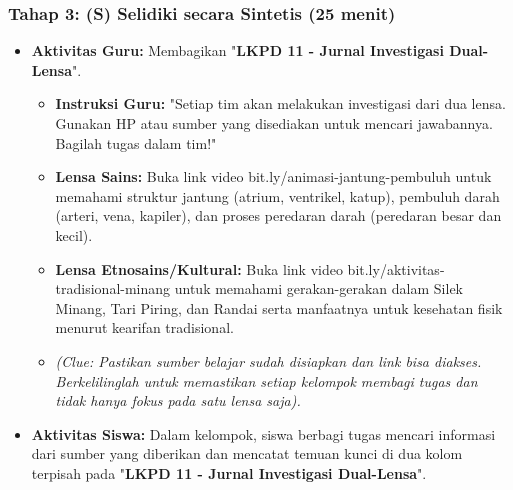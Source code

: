 \documentclass[a4paper,12pt]{article}
\begin{document}
\subsubsection{Tahap 3: (S) Selidiki secara Sintetis (25 menit)}
\begin{itemize}
\item \textbf{Aktivitas Guru:} Membagikan "\textbf{LKPD 11 - Jurnal Investigasi Dual-Lensa}".
    \begin{itemize}
    \item \textbf{Instruksi Guru:} "Setiap tim akan melakukan investigasi dari dua lensa. Gunakan HP atau sumber yang disediakan untuk mencari jawabannya. Bagilah tugas dalam tim!"
    \item \textbf{Lensa Sains:} Buka link video bit.ly/animasi-jantung-pembuluh untuk memahami struktur jantung (atrium, ventrikel, katup), pembuluh darah (arteri, vena, kapiler), dan proses peredaran darah (peredaran besar dan kecil).
    \item \textbf{Lensa Etnosains/Kultural:} Buka link video bit.ly/aktivitas-tradisional-minang untuk memahami gerakan-gerakan dalam Silek Minang, Tari Piring, dan Randai serta manfaatnya untuk kesehatan fisik menurut kearifan tradisional.
    \item \textit{(Clue: Pastikan sumber belajar sudah disiapkan dan link bisa diakses. Berkelilinglah untuk memastikan setiap kelompok membagi tugas dan tidak hanya fokus pada satu lensa saja).}
    \end{itemize}
\item \textbf{Aktivitas Siswa:} Dalam kelompok, siswa berbagi tugas mencari informasi dari sumber yang diberikan dan mencatat temuan kunci di dua kolom terpisah pada "\textbf{LKPD 11 - Jurnal Investigasi Dual-Lensa}".
\end{itemize}
\end{document}
